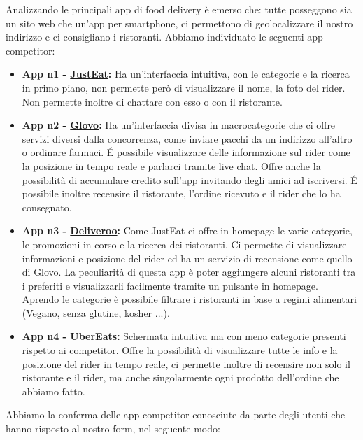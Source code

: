 \documentclass{article}
\begin{document}
     \par
    \vspace{0.5cm}
    Analizzando le principali app di food delivery è emerso che: tutte posseggono sia un sito web che un'app per smartphone, ci permettono di geolocalizzare il nostro indirizzo e ci consigliano i ristoranti.
    Abbiamo individuato le seguenti app competitor:
\begin{itemize}
        \item \textbf{App n1 - \href{https://www.justeat.it}{JustEat}:} Ha un’interfaccia intuitiva, con le categorie e la ricerca in primo piano, non permette però di visualizzare il nome, la foto del rider. Non permette inoltre di chattare con esso o con il ristorante.

        \item \textbf{App n2 - \href{https://glovoapp.com/it/it/}{Glovo}:} Ha un'interfaccia divisa in macrocategorie che ci offre servizi diversi dalla concorrenza, come inviare pacchi da un indirizzo all’altro o ordinare farmaci. É possibile visualizzare delle informazione sul rider come la posizione in tempo reale e parlarci tramite live chat. Offre anche la possibilità di accumulare credito sull’app invitando degli amici ad iscriversi. É possibile inoltre recensire il ristorante, l’ordine ricevuto e il rider che lo ha consegnato.

        \item \textbf{App n3 - \href{https://deliveroo.it/it/}{Deliveroo}:} Come JustEat ci offre in homepage le varie categorie, le promozioni in corso e la ricerca dei ristoranti. Ci permette di visualizzare informazioni e posizione del rider ed ha un servizio di recensione come quello di Glovo. La peculiarità di questa app è poter aggiungere alcuni ristoranti tra i preferiti e visualizzarli facilmente tramite un pulsante in homepage. Aprendo le categorie è possibile filtrare i ristoranti in base a regimi alimentari (Vegano, senza glutine, kosher ...).

        \item \textbf{App n4 - \href{https://www.ubereats.com/it}{UberEats}:} Schermata intuitiva ma con meno categorie presenti rispetto ai competitor. Offre la possibilità di visualizzare tutte le info e la posizione del rider in tempo reale, ci permette inoltre di recensire non solo il ristorante e il rider, ma anche singolarmente ogni prodotto dell’ordine che abbiamo fatto.

    

\end{itemize}Abbiamo la conferma delle app competitor conosciute da parte degli utenti che hanno risposto al nostro form, nel seguente modo:
\end{document}

